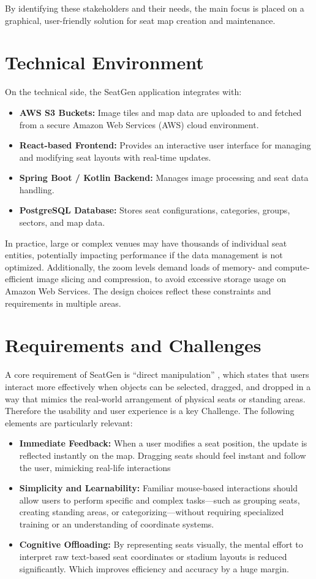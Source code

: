 By identifying these stakeholders and their needs, the main focus is placed on a graphical, user-friendly solution for seat map creation and maintenance.

\section{Technical Environment}
On the technical side, the SeatGen application integrates with:
\begin{itemize}
    \item \textbf{AWS S3 Buckets:} Image tiles and map data are uploaded to and fetched from a secure Amazon Web Services (AWS) cloud environment.
    \item \textbf{React-based Frontend:} Provides an interactive user interface for managing and modifying seat layouts with real-time updates.  
    \item \textbf{Spring Boot / Kotlin Backend:} Manages image processing and seat data handling.  
    \item \textbf{PostgreSQL Database:} Stores seat configurations, categories, groups, sectors, and map data.  
\end{itemize}

In practice, large or complex venues may have thousands of individual seat entities, potentially impacting performance if the data management is not optimized. Additionally, the zoom levels demand loads of memory- and compute-efficient image slicing and compression, to avoid excessive storage usage on Amazon Web Services. The design choices reflect these constraints and requirements in multiple areas.

\section{Requirements and Challenges}
A core requirement of SeatGen is “direct manipulation” \cite{Hutchins01121985}, which states that users interact more effectively when objects can be selected, dragged, and dropped in a way that mimics the real-world arrangement of physical seats or standing areas. Therefore the usability and user experience is a key Challenge. The following elements are particularly relevant:

\begin{itemize}
    \item \textbf{Immediate Feedback:} When a user modifies a seat position, the update is reflected instantly on the map. Dragging seats should feel instant and follow the user, mimicking real-life interactions
    \item \textbf{Simplicity and Learnability:} Familiar mouse-based interactions should allow users to perform specific and complex tasks—such as grouping seats, creating standing areas, or categorizing—without requiring specialized training or an understanding of coordinate systems.
    \item \textbf{Cognitive Offloading:} By representing seats visually, the mental effort to interpret raw text-based seat coordinates or stadium layouts is reduced significantly. Which improves efficiency and accuracy by a huge margin.
\end{itemize}

